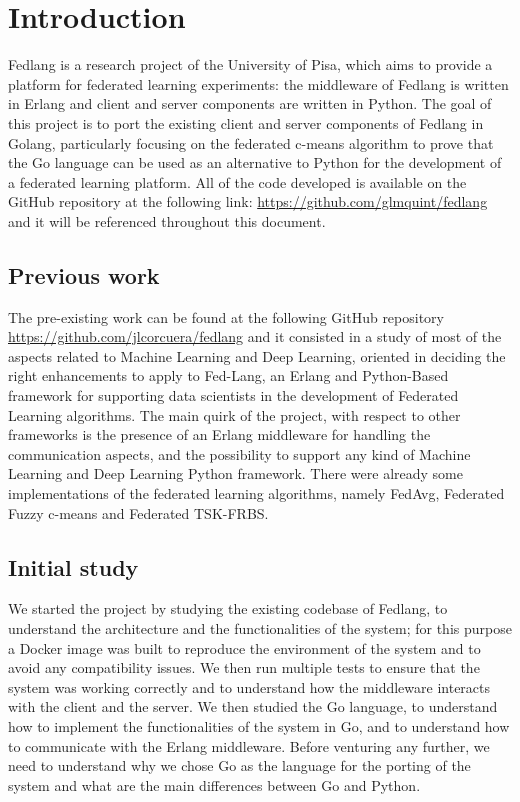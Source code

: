 \chapter{Introduction}
Fedlang is a research project of the University of Pisa, which aims to provide a platform for federated learning experiments:
the middleware of Fedlang is written in Erlang and client and server components are written in Python.
The goal of this project is to port the existing client and server components of Fedlang in Golang, particularly focusing on the federated c-means algorithm to prove that the Go language can be used as an alternative to Python for the development of a federated learning platform. All of the code developed is available on the GitHub repository at the following link: \url{https://github.com/glmquint/fedlang} and it will be referenced throughout this document.

\section{Previous work}
The pre-existing work can be found at the following GitHub repository \url{https://github.com/jlcorcuera/fedlang} and it consisted in a study of most of the aspects related to Machine Learning and Deep Learning, oriented in deciding the right enhancements to apply to Fed-Lang, an Erlang and Python-Based framework for supporting data scientists in the development of Federated Learning algorithms. The main quirk of the project, with respect to other frameworks is the presence of an Erlang middleware for handling the communication aspects, and the possibility to support any kind of Machine Learning and Deep Learning Python framework. There were already some implementations of the federated learning algorithms, namely FedAvg, Federated Fuzzy c-means and Federated TSK-FRBS.

\section{Initial study}
We started the project by studying the existing codebase of Fedlang, to understand the architecture and the functionalities of the system; for this purpose a Docker image was built to reproduce the environment of the system and to avoid any compatibility issues.
We then run multiple tests to ensure that the system was working correctly and to understand how the middleware interacts with the client and the server. 
We then studied the Go language, to understand how to implement the functionalities of the system in Go, and to understand how to communicate with the Erlang middleware. Before venturing any further, we need to understand why we chose Go as the language for the porting of the system and what are the main differences between Go and Python.


